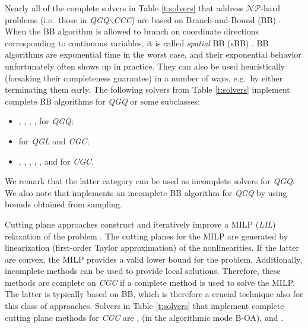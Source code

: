 Nearly all of the complete solvers in Table \ref{t:solvers} that address $\mathcal{NP}$-hard problems (i.e.~those in \textit{QGQ}$\smallsetminus$\textit{CCC}) are based on Branch-and-Bound (BB) \cite{land_doig}. When the BB algorithm is allowed to branch on coordinate directions corresponding to continuous variables, it is called \emph{spatial} BB (sBB) \cite{dakin,couenne}. BB algorithms are exponential time in the worst case, and their exponential behavior unfortunately often shows up in practice. They can also be used heuristically (forsaking their completeness guarantee) in a number of ways, e.g.~by either terminating them early. The following solvers from Table \ref{t:solvers} implement complete BB algorithms for \textit{QGQ} or some subclasses: 
%
\begin{itemize}
 \item \antigone, \baron, \couenne, \lindo, \scip for \textit{QGQ};
\item \cplex for \textit{QGL} and \textit{CGC};
%
 \item \knitro, \bonmin, \sbb, \xpress, \gurobi, and \mosek for \textit{CGC}.
\end{itemize}
%
We remark that the latter category can be used as incomplete solvers for \textit{QGQ}. We also note that \lgo implements an incomplete BB algorithm for \textit{QCQ} by using bounds obtained from sampling.

Cutting plane approaches construct and iteratively improve a MILP (\textit{LIL}) relaxation of the problem \cite{DuGr86,WePoe02}. The cutting planes for the MILP are generated by linearization (first-order Taylor approximation) of the nonlinearities. If the latter are convex, the MILP provides a valid lower bound for the problem. Additionally, incomplete methods can be used to provide local solutions. Therefore, these methods are complete on \textit{CGC} if a complete method is used to solve the MILP. The latter is typically based on BB, which is therefore a crucial technique also for this class of approaches. Solvers in Table \ref{t:solvers} that implement complete cutting plane methods for \textit{CGC} are \alphaecp, \bonmin (in the algorithmic mode B-OA), and \dicopt.

